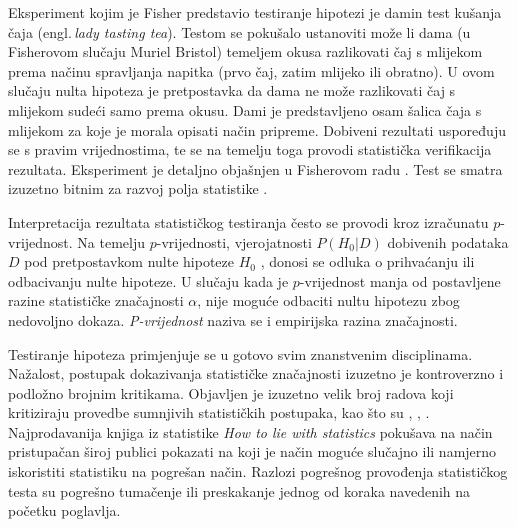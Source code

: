 Eksperiment kojim je Fisher predstavio testiranje hipotezi je damin test kušanja čaja (engl.\,\textit{lady tasting tea}). Testom se pokušalo ustanoviti može li dama (u Fisherovom slučaju Muriel Bristol) temeljem okusa razlikovati čaj s mlijekom prema načinu spravljanja napitka (prvo čaj, zatim mlijeko ili obratno). U ovom slučaju nulta hipoteza je pretpostavka da dama ne može razlikovati čaj s mlijekom sudeći samo prema okusu. Dami je predstavljeno osam šalica čaja s mlijekom za koje je morala opisati način pripreme. Dobiveni rezultati uspoređuju se s pravim vrijednostima, te se na temelju toga provodi statistička verifikacija rezultata. Eksperiment je detaljno objašnjen u Fisherovom radu \cite{fisher1935design}. Test se smatra izuzetno bitnim za razvoj polja statistike \citep{potter2001lady}.

Interpretacija rezultata statističkog testiranja često se provodi kroz izračunatu $p$-vrijednost. Na temelju $p$-vrijednosti, vjerojatnosti $P(H_0|D)$ dobivenih podataka $D$ pod pretpostavkom nulte hipoteze $H_0$ , donosi se odluka o prihvaćanju ili odbacivanju nulte hipoteze. U slučaju kada je $p$-vrijednost manja od postavljene razine statističke značajnosti $\alpha$, nije moguće odbaciti nultu hipotezu zbog nedovoljno dokaza. \textit{P-vrijednost} naziva se i empirijska razina značajnosti.

Testiranje hipoteza primjenjuje se u gotovo svim znanstvenim disciplinama. Nažalost, postupak dokazivanja statističke značajnosti izuzetno je kontroverzno i podložno brojnim kritikama. Objavljen je izuzetno velik broj radova koji kritiziraju provedbe sumnjivih statističkih postupaka, kao što su \citep{hedges1985statistical}, \citep{dar1994misuse}, \citep{yoccoz1991use}. Najprodavanija knjiga iz statistike \textit{How to lie with statistics} \citep{huff2010lie} pokušava na način pristupačan široj publici pokazati na koji je način moguće slučajno ili namjerno iskoristiti statistiku na pogrešan način. Razlozi pogrešnog provođenja statističkog testa su pogrešno tumačenje ili preskakanje jednog od koraka navedenih na početku poglavlja.


